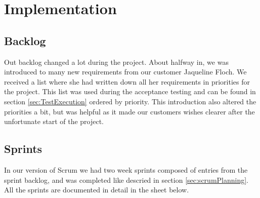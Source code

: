 \section{Implementation}
\thispagestyle{plain}

\subsection{Backlog}

Out backlog changed a lot during the project. About halfway in, we was introduced to many new requirements from our customer Jaqueline Floch. We received a list where she had written down all her requirements in priorities for the project. This list was used during the acceptance testing and can be found in section \ref{sec:TestExecution} ordered by priority. This introduction also altered the priorities a bit, but was helpful as it made our customers wishes clearer after the unfortunate start of the project.




\subsection{Sprints}

In our version of Scrum we had two week sprints composed of entries from the sprint backlog, and was completed like descried in section \ref{sec:scrumPlanning}.
All the sprints are documented in detail in the sheet below.





